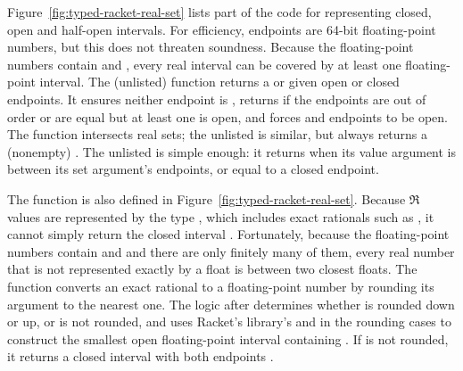 Figure~\ref{fig:typed-racket-real-set} lists part of the code for representing closed, open and half-open intervals.
For efficiency, endpoints are 64-bit floating-point numbers, but this does not threaten soundness.
Because the floating-point numbers contain  and , every real interval can be covered by at least one floating-point interval.
The (unlisted)  function returns a  or  given open or closed endpoints.
It ensures neither endpoint is , returns  if the endpoints are out of order or are equal but at least one is open, and forces  and  endpoints to be open.
The  function intersects real sets; the unlisted  is similar, but always returns a (nonempty) .
The unlisted  is simple enough: it returns  when its value argument is between its set argument's endpoints, or equal to a closed endpoint.

The function  is also defined in Figure~\ref{fig:typed-racket-real-set}.
Because $\Re$ values are represented by the type , which includes exact rationals such as , it cannot simply return the closed interval .
Fortunately, because the floating-point numbers contain  and  and there are only finitely many of them, every real number that is not represented exactly by a float is between two closest floats.
The  function converts an exact rational to a floating-point number by rounding its argument to the nearest one.
The logic after  determines whether  is rounded down or up, or is not rounded, and uses Racket's  library's  and  in the rounding cases to construct the smallest open floating-point interval containing .
If  is not rounded, it returns a closed interval with both endpoints .

